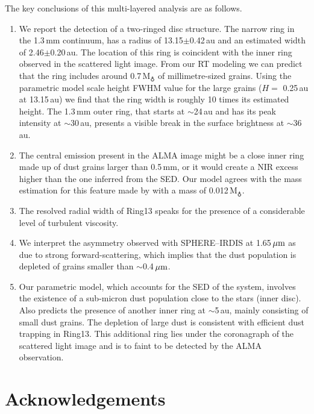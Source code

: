 \documentclass[fleqn,usenatbib,useAMS]{mnras}
\begin{document}
The key conclusions of this multi-layered analysis are as follows.
\begin{enumerate}
  \item We report the detection of a two-ringed disc structure. The narrow ring in the 1.3\,mm continuum, has a radius of 13.15$\pm$0.42\,au and an estimated width of 2.46$\pm$0.20\,au. The location of this ring is coincident with the inner ring observed in the scattered light image. From our RT modeling we can predict that the ring includes around 0.7\,M$_{\earth}$ of millimetre-sized grains. Using the parametric model scale height FWHM value for the large grains ($H=$ 0.25\,au at 13.15\,au) we find that the ring width is roughly 10 times its estimated height. The 1.3\,mm outer ring, that starts at $\sim$24\,au and has its peak intensity at $\sim$30\,au, presents a visible break in the surface brightness at $\sim$36\,au.
  
  \item The central emission present in the ALMA image might be a close inner ring made up of dust grains larger than 0.5\,mm, or it would create a NIR excess higher than the one inferred from the SED. Our model agrees with the mass estimation for this feature made by \citet{Francis_2020} with a mass of 0.012\,M$_{\earth}$. 
  
  \item The resolved radial width of Ring13 speaks for the presence of a considerable level of turbulent viscosity.

  \item We interpret the asymmetry observed with SPHERE--IRDIS at 1.65\,$\hbox{$\mu$m}$ as due to strong forward-scattering, which implies that the dust population is depleted of grains smaller than $\sim$0.4\,$\hbox{$\mu$m}$.
  
  \item Our parametric model, which accounts for the SED of the system, involves the existence of a sub-micron dust population close to the stars (inner disc). Also predicts the presence of another inner ring at $\sim$5\,au, mainly consisting of small dust grains. The depletion of large dust is consistent with efficient dust trapping in Ring13. This additional ring lies under the coronagraph of the scattered light image and is to faint to be detected by the ALMA observation.
\end{enumerate}



\section*{Acknowledgements}
\end{document}
